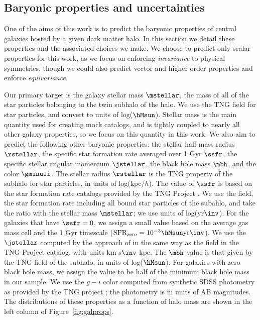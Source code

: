 \subsection{Baryonic properties and uncertainties}
\label{sec:galprops}

One of the aims of this work is to predict the baryonic properties of central galaxies hosted by a given dark matter halo.
In this section we detail these properties and the associated choices we make. 
We choose to predict only scalar properties for this work, as we focus on enforcing \emph{invariance} to physical symmetries, though we could also predict vector and higher order properties and enforce \emph{equivariance}.

Our primary target is the galaxy stellar mass $\mstellar$, the mass of all of the star particles belonging to the twin \hydro subhalo of the \dark halo.
We use the TNG field  for star particles, and convert to units of log($\hMsun$).
Stellar mass is the main quantity used for creating mock catalogs, and is tightly coupled to nearly all other galaxy properties, so we focus on this quantity in this work.
We also aim to predict the following other baryonic properties: 
the stellar half-mass radius $\rstellar$, the specific star formation rate averaged over 1 Gyr $\ssfr$, the specific stellar angular momentum $\jstellar$, the black hole mass $\mbh$, and the color $\gminusi$. 
The stellar radius $\rstellar$ is the TNG property  of the subhalo for star particles, in units of log(kpc/$h$).
The value of $\ssfr$ is based on the star formation rate catalogs provided by the TNG Project \citep{donnari_star-formation_2019,pillepich_first_2019}.
We use the  field, the star formation rate including all bound star particles of the subahlo, and take the ratio with the stellar mass $\mstellar$; we use units of log(yr$\inv$).
For the galaxies that have $\ssfr=0$, we assign a small value based on the average gas mass cell and the 1 Gyr timescale ($\text{SFR}_\mathrm{zero} = 10^{-3} \hMsun \text{yr}\inv$).
We use the $\jstellar$ computed by the approach of \cite{genel_galactic_2015} in the same way as the  field in the TNG Project catalog, with units km s$\inv$ kpc. 
The $\mbh$ value is that given by the TNG field  of the subhalo, in units of log($\hMsun$).
For galaxies with zero black hole mass, we assign the value to be half of the minimum black hole mass in our sample. 
We use the $g-i$ color computed from synthetic SDSS photometry as provided by the TNG project \citep{nelson_first_2018}; the photometry is in units of AB magnitudes. 
The distributions of these properties as a function of \dark halo mass are shown in the left column of Figure~\ref{fig:galprops}.

